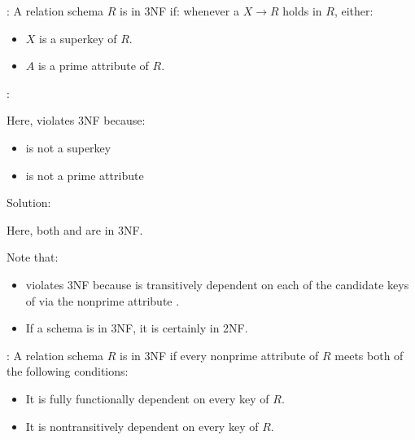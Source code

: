     \par {}: A relation schema $R$ is in 3NF if: whenever a  $X \to R$ holds in $R$, either:
    \begin{itemize}
      \item $X$ is a superkey of $R$.
      \item $A$ is a prime attribute of $R$.
    \end{itemize}
    \par {}:
    \par Here,  violates 3NF because:
    \begin{itemize}
      \item {} is not a superkey
      \item {} is not a prime attribute
    \end{itemize}
    \par Solution:
    \par Here, both  and  are in 3NF.
    \par Note that:
    \begin{itemize}
      \item {} violates 3NF because  is transitively dependent on each of the candidate keys of  via the nonprime attribute .
      \item If a schema is in 3NF, it is certainly in 2NF.
    \end{itemize}

    \par {}: A relation schema $R$ is in 3NF if every nonprime attribute of $R$ meets both of the following conditions:
    \begin{itemize}
      \item It is fully functionally dependent on every key of $R$.
      \item It is nontransitively dependent on every key of $R$.
    \end{itemize}

    \par
